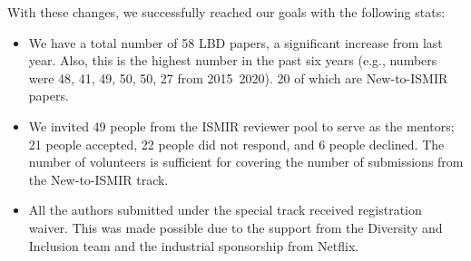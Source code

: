 \documentclass[%
10pt,								%
titlepage,						%
]
{scrartcl}
\begin{document}
        
            With these changes, we successfully reached our goals with the following stats: 
            \begin{itemize}
                \item   We have a total number of 58 LBD papers, a significant increase from last year. Also, this is the highest number in the past six years (e.g., numbers were 48, 41, 49, 50, 50, 27 from 2015~2020). 20 of which are New-to-ISMIR papers.
                \item   We invited 49 people from the ISMIR reviewer pool to serve as the mentors; 21 people accepted, 22 people did not respond, and 6 people declined. The number of volunteers is sufficient for covering the number of submissions from the New-to-ISMIR track.

                \item   All the authors submitted under the special track received registration waiver. This was made possible due to the support from the Diversity and Inclusion team and the industrial sponsorship from Netflix. 
            \end{itemize}
\end{document}
